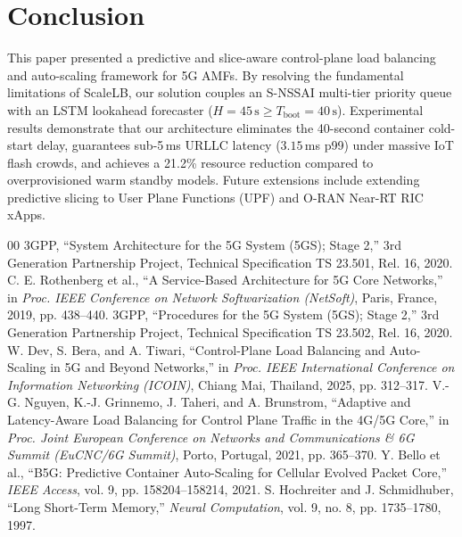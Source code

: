 \documentclass[conference]{IEEEtran}
\begin{document}
\section{Conclusion}
This paper presented a predictive and slice-aware control-plane load balancing and auto-scaling framework for 5G AMFs. By resolving the fundamental limitations of ScaleLB, our solution couples an S-NSSAI multi-tier priority queue with an LSTM lookahead forecaster ($H = 45\,\text{s} \ge T_{\text{boot}} = 40\,\text{s}$). Experimental results demonstrate that our architecture eliminates the 40-second container cold-start delay, guarantees sub-5\,ms URLLC latency ($3.15$\,ms p99) under massive IoT flash crowds, and achieves a 21.2\% resource reduction compared to overprovisioned warm standby models. Future extensions include extending predictive slicing to User Plane Functions (UPF) and O-RAN Near-RT RIC xApps.

\begin{thebibliography}{00}
 3GPP, ``System Architecture for the 5G System (5GS); Stage 2,'' 3rd Generation Partnership Project, Technical Specification TS 23.501, Rel. 16, 2020.
 C. E. Rothenberg et al., ``A Service-Based Architecture for 5G Core Networks,'' in \textit{Proc. IEEE Conference on Network Softwarization (NetSoft)}, Paris, France, 2019, pp. 438--440.
 3GPP, ``Procedures for the 5G System (5GS); Stage 2,'' 3rd Generation Partnership Project, Technical Specification TS 23.502, Rel. 16, 2020.
 W. Dev, S. Bera, and A. Tiwari, ``Control-Plane Load Balancing and Auto-Scaling in 5G and Beyond Networks,'' in \textit{Proc. IEEE International Conference on Information Networking (ICOIN)}, Chiang Mai, Thailand, 2025, pp. 312--317.
 V.-G. Nguyen, K.-J. Grinnemo, J. Taheri, and A. Brunstrom, ``Adaptive and Latency-Aware Load Balancing for Control Plane Traffic in the 4G/5G Core,'' in \textit{Proc. Joint European Conference on Networks and Communications \& 6G Summit (EuCNC/6G Summit)}, Porto, Portugal, 2021, pp. 365--370.
 Y. Bello et al., ``B5G: Predictive Container Auto-Scaling for Cellular Evolved Packet Core,'' \textit{IEEE Access}, vol. 9, pp. 158204--158214, 2021.
 S. Hochreiter and J. Schmidhuber, ``Long Short-Term Memory,'' \textit{Neural Computation}, vol. 9, no. 8, pp. 1735--1780, 1997.
\end{thebibliography}
\end{document}
